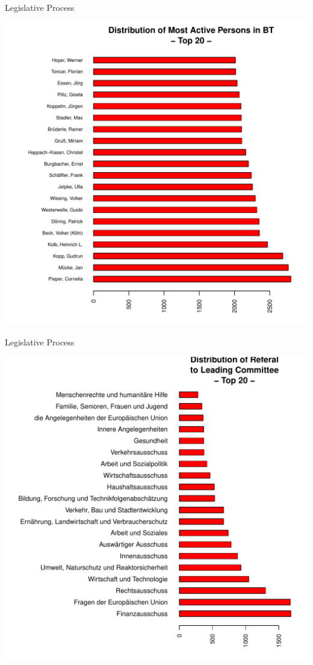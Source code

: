 \documentclass[ignorenonframetext,]{beamer}
\begin{document}
\begin{frame}{Legislative Process}

\includegraphics{fig/legislation2.pdf}

\end{frame}

\begin{frame}{Legislative Process}

\includegraphics{fig/legislation3.pdf}

\end{frame}
\end{document}
